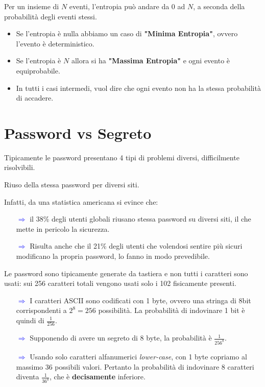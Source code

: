 \begin{note}
Per un insieme di $N$ eventi, l'entropia può andare da 0 ad $N$, a seconda della probabilità degli eventi stessi. 
\begin{itemize}
    \item Se l'entropia è nulla abbiamo un caso di \textbf{"Minima Entropia"}, ovvero l'evento è deterministico.
    \item Se l'entropia è $N$ allora si ha \textbf{"Massima Entropia"} e ogni evento è equiprobabile.
    \item In tutti i casi intermedi, vuol dire che ogni evento non ha la stessa probabilità di accadere.
\end{itemize} 
\end{note}\pagebreak
\section{Password vs Segreto}
Tipicamente le password presentano 4 tipi di problemi diversi, difficilmente risolvibili.
\begin{definition}[Overload]
Riuso della stessa password per diversi siti.
\end{definition}
Infatti, da una statistica americana si evince che:
\begin{itemize}
    \item [\textcolor{blue}{$\Rightarrow$}]il 38\% degli utenti globali riusano stessa password su diversi siti, il che mette in pericolo la sicurezza.
    \item [\textcolor{blue}{$\Rightarrow$}]Risulta anche che il 21\% degli utenti che volendosi sentire più sicuri modificano la propria password, lo fanno in modo prevedibile.
\end{itemize}
\begin{definition}
Le password sono tipicamente generate da tastiera e non tutti i caratteri sono usati:  sui 256 caratteri totali vengono usati solo i 102 fisicamente presenti.
\end{definition}
\begin{itemize}
    \item [\textcolor{blue}{$\Rightarrow$}]I caratteri ASCII sono codificati con 1 byte, ovvero una stringa di 8bit corrispondenti a $2^8=256$ possibilità. La probabilità di indovinare 1 bit è quindi di $\frac{1}{256}$. 
    \item [\textcolor{blue}{$\Rightarrow$}]Supponendo di avere un segreto di 8 byte, la probabilità è $\frac{1}{256^8}$.
    \item [\textcolor{blue}{$\Rightarrow$}]Usando solo caratteri alfanumerici \textit{lower-case}, con 1 byte copriamo al massimo 36 possibili valori. Pertanto la probabilità di indovinare 8 caratteri diventa $\frac{1}{36^8}$, che è \textbf{decisamente} inferiore.
\end{itemize}
